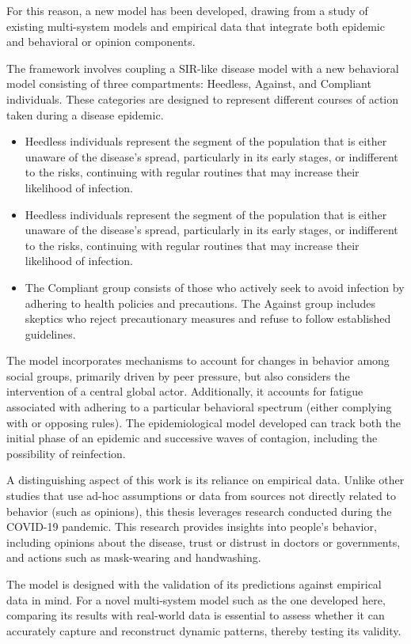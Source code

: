For this reason, a new model has been developed, drawing from a study of existing multi-system models and empirical data that integrate both epidemic and behavioral or opinion components.

The framework involves coupling a SIR-like disease model with a new behavioral model consisting of three compartments: Heedless, Against, and Compliant individuals. These categories are designed to represent different courses of action taken during a disease epidemic.
\begin{itemize}
	\item Heedless individuals represent the segment of the population that is either unaware of the disease’s spread, particularly in its early stages, or indifferent to the risks, continuing with regular routines that may increase their likelihood of infection.
	\item Heedless individuals represent the segment of the population that is either unaware of the disease’s spread, particularly in its early stages, or indifferent to the risks, continuing with regular routines that may increase their likelihood of infection.
	\item The Compliant group consists of those who actively seek to avoid infection by adhering to health policies and precautions.
	The Against group includes skeptics who reject precautionary measures and refuse to follow established guidelines.
\end{itemize}

The model incorporates mechanisms to account for changes in behavior among social groups, primarily driven by peer pressure, but also considers the intervention of a central global actor. Additionally, it accounts for fatigue associated with adhering to a particular behavioral spectrum (either complying with or opposing rules). The epidemiological model developed can track both the initial phase of an epidemic and successive waves of contagion, including the possibility of reinfection.

A distinguishing aspect of this work is its reliance on empirical data. Unlike other studies that use ad-hoc assumptions or data from sources not directly related to behavior (such as opinions), this thesis leverages research conducted during the COVID-19 pandemic. This research provides insights into people's behavior, including opinions about the disease, trust or distrust in doctors or governments, and actions such as mask-wearing and handwashing.

The model is designed with the validation of its predictions against empirical data in mind. For a novel multi-system model such as the one developed here, comparing its results with real-world data is essential to assess whether it can accurately capture and reconstruct dynamic patterns, thereby testing its validity.


